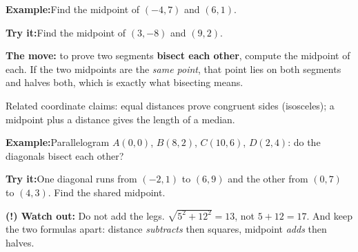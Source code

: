 \documentclass[12pt]{article}
\begin{document}
\begin{examplebox}
\textbf{Example:}\quad Find the midpoint of $(-4, 7)$ and $(6, 1)$.
\end{examplebox}

\begin{tryitbox}
\textbf{Try it:}\quad Find the midpoint of $(3, -8)$ and $(9, 2)$.\\[2pt]
\end{tryitbox}


\begin{formulabox}
\textbf{The move:} to prove two segments \textbf{bisect each other}, compute the midpoint
of each. If the two midpoints are the \emph{same point}, that point lies on both segments
and halves both, which is exactly what bisecting means.\par
Related coordinate claims: equal distances prove congruent sides (isosceles); a midpoint
plus a distance gives the length of a median.
\end{formulabox}

\begin{examplebox}
\textbf{Example:}\quad Parallelogram $A(0,0)$, $B(8,2)$, $C(10,6)$, $D(2,4)$: do the
diagonals bisect each other?
\end{examplebox}

\begin{tryitbox}
\textbf{Try it:}\quad One diagonal runs from $(-2, 1)$ to $(6, 9)$ and the other from
$(0, 7)$ to $(4, 3)$. Find the shared midpoint.\\[2pt]
\end{tryitbox}

\begin{watchoutbox}
\textbf{(!) Watch out:} Do not add the legs. $\sqrt{5^2 + 12^2} = 13$, not $5 + 12 = 17$.
And keep the two formulas apart: distance \emph{subtracts} then squares, midpoint
\emph{adds} then halves.
\end{watchoutbox}
\end{document}
